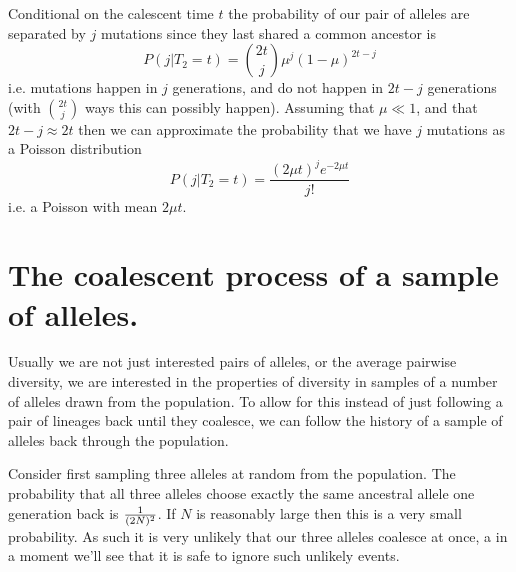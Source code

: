 Conditional on the calescent time $t$ the probability of our pair of alleles are separated by $j$ mutations
since they last shared a common ancestor is
\begin{equation}
P(j | T_2 = t ) = {2t \choose j} \mu^{j} (1-\mu)^{2t-j}
\end{equation}
i.e. mutations happen in $j$ generations, and do not happen in $2t-j$
generations (with ${2t \choose j}$ ways this can possibly
happen). Assuming that $\mu \ll 1$, and that $2t-j \approx 2t$ then we
can approximate the probability that we have $j$ mutations as a
Poisson distribution
\begin{equation}
P(j | T_2 = t ) = \frac{ (2 \mu t )^{j} e^{-2\mu t}}{j!}
\end{equation}
i.e. a Poisson with mean $2\mu t $. \\


\section{The coalescent process of a sample of alleles.}

Usually we are not just interested pairs of alleles, or the
average pairwise diversity, we are interested in the properties of
diversity in samples of a number of alleles drawn from the population.  
To allow for this instead of just following a pair of lineages back until they
coalesce, we can follow the history of a sample of alleles back
through the population.

Consider first sampling three alleles at random from the population. The
probability that all three alleles choose exactly the same ancestral allele one
generation back is $\nicefrac{1}{(2N)^2}$. If $N$ is reasonably large then this
is a very small probability. As such it is very unlikely that our three alleles
coalesce at once, a in a moment we'll see that it is safe to ignore such
unlikely events. \\

